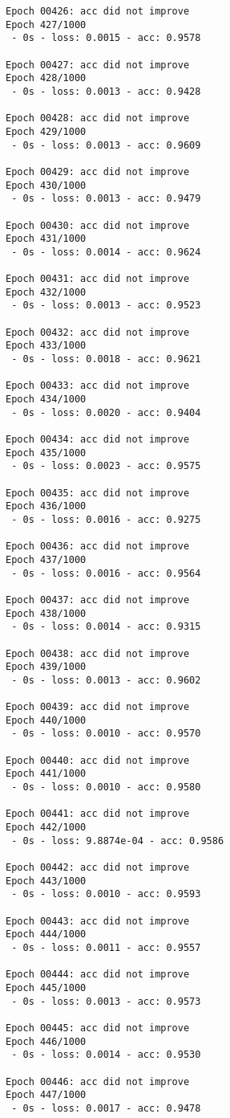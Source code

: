 \documentclass[11pt]{article}
\begin{document}
\begin{Verbatim}[commandchars=\\\{\}]
Epoch 00426: acc did not improve
Epoch 427/1000
 - 0s - loss: 0.0015 - acc: 0.9578

Epoch 00427: acc did not improve
Epoch 428/1000
 - 0s - loss: 0.0013 - acc: 0.9428

Epoch 00428: acc did not improve
Epoch 429/1000
 - 0s - loss: 0.0013 - acc: 0.9609

Epoch 00429: acc did not improve
Epoch 430/1000
 - 0s - loss: 0.0013 - acc: 0.9479

Epoch 00430: acc did not improve
Epoch 431/1000
 - 0s - loss: 0.0014 - acc: 0.9624

Epoch 00431: acc did not improve
Epoch 432/1000
 - 0s - loss: 0.0013 - acc: 0.9523

Epoch 00432: acc did not improve
Epoch 433/1000
 - 0s - loss: 0.0018 - acc: 0.9621

Epoch 00433: acc did not improve
Epoch 434/1000
 - 0s - loss: 0.0020 - acc: 0.9404

Epoch 00434: acc did not improve
Epoch 435/1000
 - 0s - loss: 0.0023 - acc: 0.9575

Epoch 00435: acc did not improve
Epoch 436/1000
 - 0s - loss: 0.0016 - acc: 0.9275

Epoch 00436: acc did not improve
Epoch 437/1000
 - 0s - loss: 0.0016 - acc: 0.9564

Epoch 00437: acc did not improve
Epoch 438/1000
 - 0s - loss: 0.0014 - acc: 0.9315

Epoch 00438: acc did not improve
Epoch 439/1000
 - 0s - loss: 0.0013 - acc: 0.9602

Epoch 00439: acc did not improve
Epoch 440/1000
 - 0s - loss: 0.0010 - acc: 0.9570

Epoch 00440: acc did not improve
Epoch 441/1000
 - 0s - loss: 0.0010 - acc: 0.9580

Epoch 00441: acc did not improve
Epoch 442/1000
 - 0s - loss: 9.8874e-04 - acc: 0.9586

Epoch 00442: acc did not improve
Epoch 443/1000
 - 0s - loss: 0.0010 - acc: 0.9593

Epoch 00443: acc did not improve
Epoch 444/1000
 - 0s - loss: 0.0011 - acc: 0.9557

Epoch 00444: acc did not improve
Epoch 445/1000
 - 0s - loss: 0.0013 - acc: 0.9573

Epoch 00445: acc did not improve
Epoch 446/1000
 - 0s - loss: 0.0014 - acc: 0.9530

Epoch 00446: acc did not improve
Epoch 447/1000
 - 0s - loss: 0.0017 - acc: 0.9478


\end{Verbatim}
\end{document}
